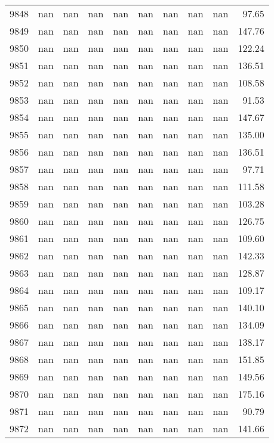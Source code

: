 \begin{tabular}{lrrrrrrrrr}
9848 & nan & nan & nan & nan & nan & nan & nan & nan & 97.65 \\
9849 & nan & nan & nan & nan & nan & nan & nan & nan & 147.76 \\
9850 & nan & nan & nan & nan & nan & nan & nan & nan & 122.24 \\
9851 & nan & nan & nan & nan & nan & nan & nan & nan & 136.51 \\
9852 & nan & nan & nan & nan & nan & nan & nan & nan & 108.58 \\
9853 & nan & nan & nan & nan & nan & nan & nan & nan & 91.53 \\
9854 & nan & nan & nan & nan & nan & nan & nan & nan & 147.67 \\
9855 & nan & nan & nan & nan & nan & nan & nan & nan & 135.00 \\
9856 & nan & nan & nan & nan & nan & nan & nan & nan & 136.51 \\
9857 & nan & nan & nan & nan & nan & nan & nan & nan & 97.71 \\
9858 & nan & nan & nan & nan & nan & nan & nan & nan & 111.58 \\
9859 & nan & nan & nan & nan & nan & nan & nan & nan & 103.28 \\
9860 & nan & nan & nan & nan & nan & nan & nan & nan & 126.75 \\
9861 & nan & nan & nan & nan & nan & nan & nan & nan & 109.60 \\
9862 & nan & nan & nan & nan & nan & nan & nan & nan & 142.33 \\
9863 & nan & nan & nan & nan & nan & nan & nan & nan & 128.87 \\
9864 & nan & nan & nan & nan & nan & nan & nan & nan & 109.17 \\
9865 & nan & nan & nan & nan & nan & nan & nan & nan & 140.10 \\
9866 & nan & nan & nan & nan & nan & nan & nan & nan & 134.09 \\
9867 & nan & nan & nan & nan & nan & nan & nan & nan & 138.17 \\
9868 & nan & nan & nan & nan & nan & nan & nan & nan & 151.85 \\
9869 & nan & nan & nan & nan & nan & nan & nan & nan & 149.56 \\
9870 & nan & nan & nan & nan & nan & nan & nan & nan & 175.16 \\
9871 & nan & nan & nan & nan & nan & nan & nan & nan & 90.79 \\
9872 & nan & nan & nan & nan & nan & nan & nan & nan & 141.66 \\

\end{tabular}
